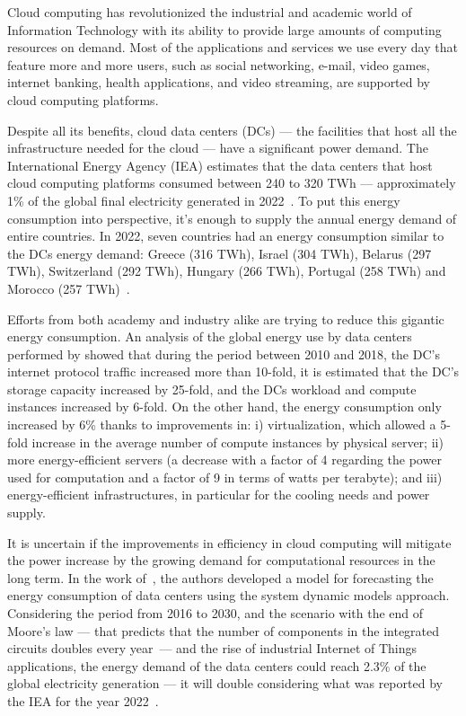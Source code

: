 
Cloud computing has revolutionized the industrial and academic world of Information Technology with its ability to provide large amounts of computing resources on demand. Most of the applications and services we use every day that feature more and more users, such as social networking, e-mail, video games, internet banking, health applications, and video streaming, are supported by cloud computing platforms.

Despite all its benefits, cloud data centers (DCs) --- the facilities that host all the infrastructure needed for the cloud --- have a significant power demand. The International Energy Agency (IEA) estimates that the data centers that host cloud computing platforms consumed between 240 to 320 TWh ---   approximately 1\% of the global final electricity generated in 2022~\cite{IEA_2022}. To put this energy consumption into perspective, it's enough to supply the annual energy demand of entire countries. In 2022, seven countries had an energy consumption similar to the DCs energy demand: Greece (316 TWh), Israel (304 TWh), Belarus (297 TWh), Switzerland (292 TWh), Hungary (266 TWh), Portugal (258 TWh) and Morocco (257 TWh)~\cite{owidenergy}.


Efforts from both academy and industry alike are trying to reduce this gigantic energy consumption. An analysis of the global energy use by data centers performed by \citet{masanet2020recalibrating} showed that during the period between 2010 and 2018, the DC's internet protocol traffic increased more than 10-fold, it is estimated that the DC's storage capacity increased by 25-fold, and the DCs workload and compute instances increased by 6-fold. On the other hand, the energy consumption only increased by 6\% thanks to improvements in: i) virtualization, which allowed a 5-fold increase in the average number of compute instances by physical server; ii) more energy-efficient servers (a decrease with a factor of 4 regarding the power used for computation and a factor of 9 in terms of watts per terabyte); and iii) energy-efficient infrastructures, in particular for the cooling needs and power supply.

It is uncertain if the improvements in efficiency in cloud computing will mitigate the power increase by the growing demand for computational resources in the long term. In the work of~\citet{koot2021usage}, the authors developed a model for forecasting the energy consumption of data centers using the system dynamic models approach. Considering the period from 2016 to 2030, and the scenario with the end of Moore's law --- that predicts that the number of components in the integrated circuits doubles every year~\cite{Mack_2011_moorelaw}---  and the rise of industrial Internet of Things applications, the energy demand of the data centers could reach 2.3\% of the global electricity generation --- it will double considering what was reported by the IEA for the year 2022~\cite{IEA_2022}.


